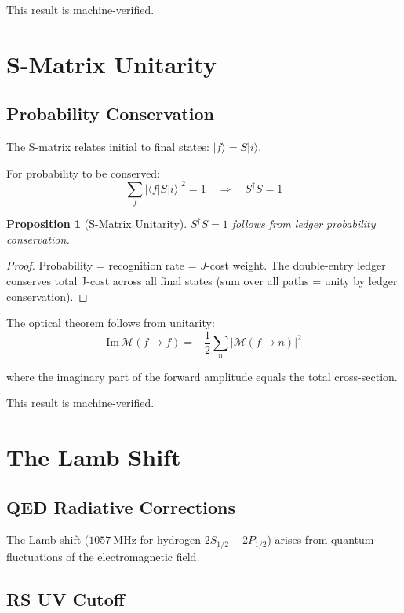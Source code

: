 \documentclass[12pt,a4paper]{article}
\newtheorem{proposition}[theorem]{Proposition}
\theoremstyle{definition}
\theoremstyle{remark}
\begin{document}
This result is machine-verified.

\section{S-Matrix Unitarity}

\subsection{Probability Conservation}

The S-matrix relates initial to final states: $|f\rangle = S|i\rangle$.

For probability to be conserved:
\begin{equation}
\sum_f |\langle f|S|i\rangle|^2 = 1 \quad \Rightarrow \quad S^\dagger S = 1
\end{equation}

\begin{proposition}[S-Matrix Unitarity]
$S^\dagger S = 1$ follows from ledger probability conservation.
\end{proposition}

\begin{proof}
Probability = recognition rate = $J$-cost weight. 
The double-entry ledger conserves total J-cost across all final states 
(sum over all paths = unity by ledger conservation).
\end{proof}

The optical theorem follows from unitarity:
\begin{equation}
\mathrm{Im}\,\mathcal{M}(f \to f) = -\frac{1}{2}\sum_n |\mathcal{M}(f \to n)|^2
\end{equation}

where the imaginary part of the forward amplitude equals the total cross-section.

This result is machine-verified.

\section{The Lamb Shift}

\subsection{QED Radiative Corrections}

The Lamb shift ($1057~\text{MHz}$ for hydrogen $2S_{1/2} - 2P_{1/2}$) arises from 
quantum fluctuations of the electromagnetic field.

\subsection{RS UV Cutoff}
\end{document}
